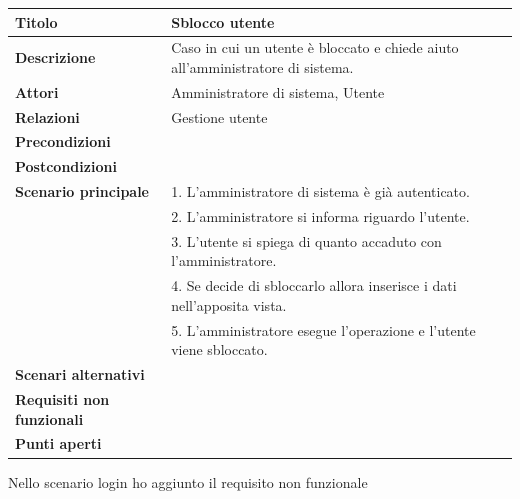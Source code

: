 \documentclass[a4paper]{article}
\begin{document}
\begin{center}
    \begin{tabularx}{1\textwidth}{|l|X|}
        \hline
        \textbf{Titolo} & Sblocco utente \\
        \hline
        \textbf{Descrizione} & Caso in cui un utente è bloccato e chiede aiuto all'amministratore di sistema. \\
        \hline
        \textbf{Attori} & Amministratore di sistema, Utente \\
        \hline
        \textbf{Relazioni} & Gestione utente \\
        \hline
        \textbf{Precondizioni} &  \\
        \hline
        \textbf{Postcondizioni} &  \\
        \hline
        \textbf{Scenario principale} & 1. L'amministratore di sistema è già autenticato.\\
                                     & 2. L'amministratore si informa riguardo l'utente.\\
                                     & 3. L'utente si spiega di quanto accaduto con l'amministratore.\\
                                     & 4. Se decide di sbloccarlo allora inserisce i dati nell'apposita vista.\\
                                     & 5. L'amministratore esegue l'operazione e l'utente viene sbloccato.\\
        \hline
        \textbf{Scenari alternativi} & \\
        \hline
        \textbf{Requisiti non funzionali} & \\
        \hline
        \textbf{Punti aperti} & \\
        \hline
    \end{tabularx}
\end{center}

Nello scenario login ho aggiunto il requisito non funzionale
\end{document}
